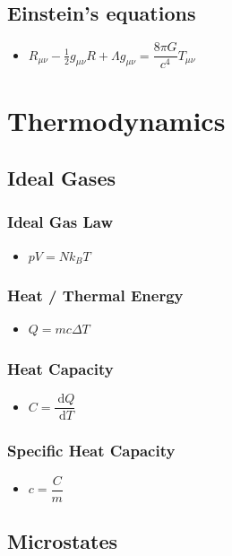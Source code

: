 \documentclass[]{report}
\newcommand \tab[1][1cm]{\hspace*{#1}}
\newcommand{\dn}[1]{\ \mathrm{d}#1}
\newcommand{\dd}[2]{ \dfrac{\dn #1}{\dn #2}}
\newcommand{\itemt}{\item \tab}
\begin{document}
		\subsection{Einstein's equations}
\begin{itemize}
\itemt \( R_{\mu\nu} - \frac{1}{2} g_{\mu\nu} R + \Lambda g_{\mu\nu}= \dfrac{8\pi G}{c^4} T_{\mu\nu} \)
\end{itemize}

	\section{Thermodynamics}



\subsection{Ideal Gases}

\subsubsection{Ideal Gas Law}
\begin{itemize}
\itemt \( pV = Nk_BT \)
\end{itemize}

\subsubsection{Heat / Thermal Energy}
\begin{itemize}
\itemt \( Q = mc \Delta T \)
\end{itemize}

\subsubsection{Heat Capacity}
\begin{itemize}
\itemt \( C = \dd{Q}{T} \)
\end{itemize}

\subsubsection{Specific Heat Capacity}
\begin{itemize}
\itemt \( c = \dfrac{C}{m} \)
\end{itemize}





\subsection{Microstates}
\end{document}
